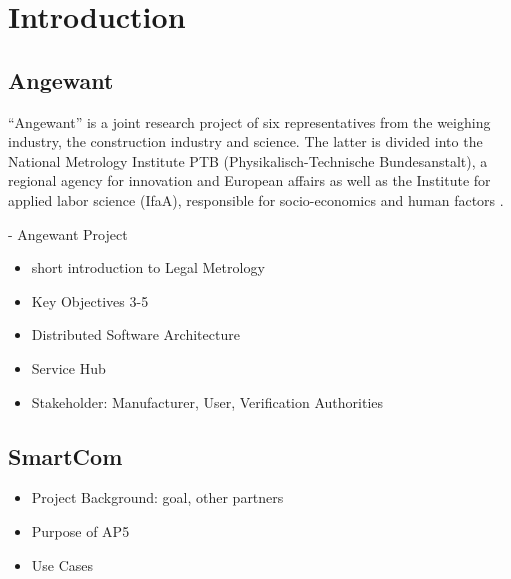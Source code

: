 \documentclass[3p,times,procedia]{elsarticle}
\begin{document}



\section{Introduction}
\label{introduction}


\subsection{ Angewant}
``Angewant'' is a joint research project of six representatives from the weighing industry, the construction industry and science. The latter is divided into the National Metrology Institute PTB (Physikalisch-Technische Bundesanstalt), a regional agency for innovation and European affairs as well as the Institute for applied labor science (IfaA), responsible for socio-economics and human factors \cite{Ottersboeck2020System}.

- Angewant Project
\begin{itemize}
    \item short introduction to Legal Metrology
    \item Key Objectives 3-5 \cite{Eichstaett2020Metrologie}
    \item Distributed Software Architecture
    \item Service Hub
    \item Stakeholder: Manufacturer, User, Verification Authorities
\end{itemize}

    


\begin{nomenclature}
\begin{deflist}[A]
 
 
 
\end{deflist}
\end{nomenclature}




\subsection{SmartCom}
\begin{itemize}
    \item Project Background: goal, other partners
    \item Purpose of AP5
    \item Use Cases
\end{itemize}
\end{document}
